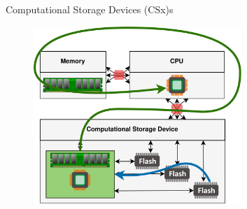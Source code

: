 \documentclass{beamer}
\begin{document}
\begin{frame}{Computational Storage Devices (CSx)s}
	\begingroup
	\small
	\begin{figure}
		\centering
		\includegraphics[width=0.7\textwidth]{resources/images/csd.png}
	\end{figure}
	\endgroup
\end{frame}

\end{document}

